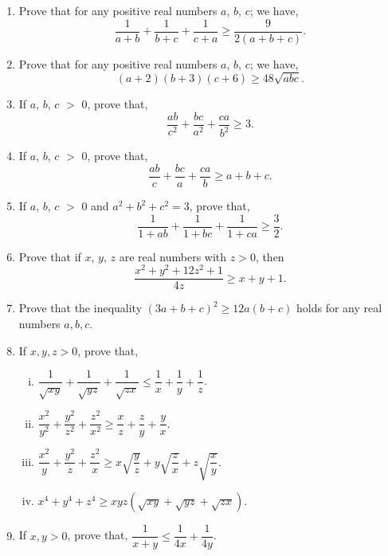 \documentclass[11pt, a4paper]{article}
\begin{document}
\begin{enumerate}

	\item Prove that for any positive real numbers $a$, $b$, $c$; we have,
$$\dfrac{1}{a+b} + \dfrac{1}{b+c} + \dfrac{1}{c+a} \geq \dfrac{9}{2(a+b+c)}.$$

	\item Prove that for any positive real numbers $a$, $b$, $c$; we have,
$$(a+2)(b+3)(c+6) \geq 48 \sqrt{abc}.$$

	\item If $a$, $b$, $c$ $>$ $0$, prove that, 
	$$\dfrac{ab}{c^2} + \dfrac{bc}{a^2} + \dfrac{ca}{b^2} \geq 3.$$
	
	\item If $a$, $b$, $c$ $>$ $0$, prove that, 
	$$\dfrac{ab}{c} + \dfrac{bc}{a} + \dfrac{ca}{b} \geq a+b+c. $$
	
	\item If $a$, $b$, $c$ $>$ $0$ and $a^2 + b^2 + c^2 = 3$, prove that, 
	$$\dfrac{1}{1+ab} + \dfrac{1}{1+bc} + \dfrac{1}{1+ca} \geq \dfrac{3}{2}.$$
	
	\item Prove that if $x$, $y$, $z$ are real numbers with $z > 0$, then $$\dfrac{x^2 + y^2 + 12z^2 + 1}{4z} \geq x + y + 1.$$

	\item Prove that the inequality $(3a + b + c)^2 \geq 12a(b+c)$ holds for any real numbers $a,b,c$.
	
	\item If $x, y, z > 0$, prove that, 
	\begin{enumerate}[(i)]
	\item $\dfrac{1}{\sqrt{xy}} + \dfrac{1}{\sqrt{yz}} + \dfrac{1}{\sqrt{zx}} \leq \dfrac{1}{x} + \dfrac{1}{y} + \dfrac{1}{z}$.
	
	\item $\dfrac{x^2}{y^2} + \dfrac{y^2}{z^2} + \dfrac{z^2}{x^2} \geq \dfrac{x}{z} + \dfrac{z}{y} + \dfrac{y}{x}$.
	
	\item $\dfrac{x^2}{y} + \dfrac{y^2}{z} + \dfrac{z^2}{x} \geq x\sqrt{\dfrac{y}{z}} + y\sqrt{\dfrac{z}{x}} + z\sqrt{\dfrac{x}{y}}$.
	
	\item $x^4 + y^4 + z^4 \geq xyz(\sqrt{xy} + \sqrt{yz} + \sqrt{zx})$.
	
	\end{enumerate}

	\item If $x, y > 0$, prove that, $\dfrac{1}{x+y} \leq \dfrac{1}{4x} + \dfrac{1}{4y}$.
	

\end{enumerate}
\end{document}
